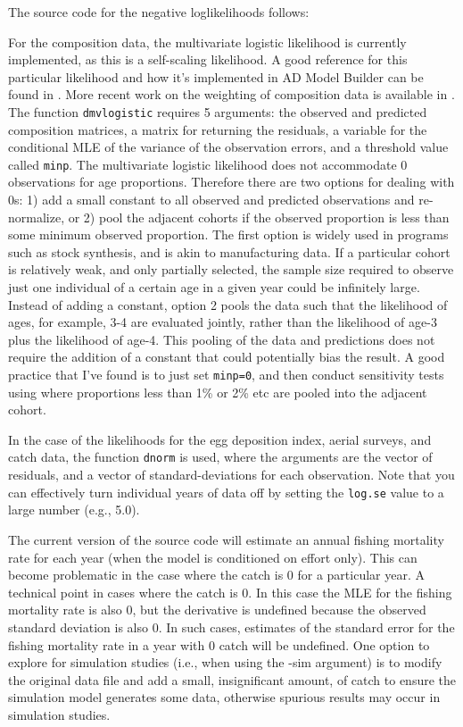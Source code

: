 \documentclass[12pt,letterpaper]{article}
\begin{document}
    The source code for the negative loglikelihoods follows:
    
    
    For the composition data, the multivariate logistic likelihood is currently implemented, as this is a self-scaling likelihood.  A good reference for this particular likelihood and how it's implemented in AD Model Builder can be found in \cite{schnute1995influence}.  More recent work on the weighting of composition data is available in \cite{francis2011data}.  The function \texttt{dmvlogistic} requires 5 arguments: the observed and predicted composition matrices, a matrix for returning the residuals, a variable for the conditional MLE of the variance of the observation errors, and a threshold value called \texttt{minp}. The multivariate logistic likelihood does not accommodate 0 observations for age proportions.  Therefore there are two options for dealing with 0s: 1) add a small constant to all observed and predicted observations and re-normalize, or 2) pool the adjacent cohorts if the observed proportion is less than some minimum observed proportion.  The first option is widely used in programs such as stock synthesis, and is akin to manufacturing data.  If a particular cohort is relatively weak, and only partially selected, the sample size required to observe just one individual of a certain age in a given year could be infinitely large.  Instead of adding a constant, option 2 pools the data such that the likelihood of ages, for example, 3-4 are evaluated jointly, rather than the likelihood of age-3 plus the likelihood of age-4.  This pooling of the data and predictions does not require the addition of a constant that could potentially bias the result.  A good practice that I've found is to just set \texttt{minp=0}, and then conduct sensitivity tests using where proportions less than 1\% or 2\% etc are pooled into the adjacent cohort.

    In the case of the likelihoods for the egg deposition index, aerial surveys, and catch data, the function \texttt{dnorm} is used, where the arguments are the vector of residuals, and a vector of standard-deviations for each observation.  Note that you can effectively turn individual years of data off by setting the \texttt{log.se} value to a large number (e.g., 5.0).

    The current version of the source code will estimate an annual fishing mortality rate for each year (when the model is conditioned on effort only).  This can become problematic in the case where the catch is 0 for a particular year.  A technical point in cases where the catch is 0. In this case the MLE for the fishing mortality rate is also 0, but the derivative is undefined because the observed standard deviation is also 0.  In such cases, estimates of the standard error for the fishing mortality rate in a year with 0 catch will be undefined.  One option to explore for simulation studies (i.e., when using the -sim argument) is to modify the original data file and add a small, insignificant amount, of catch to ensure the simulation model generates some data, otherwise spurious results may occur in  simulation studies.
\end{document}
